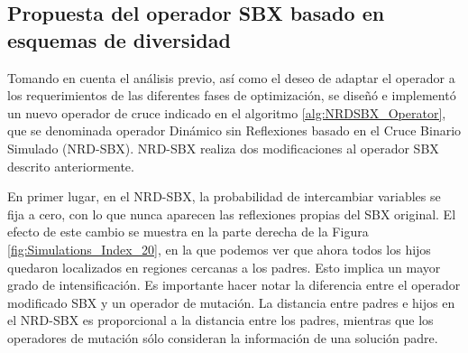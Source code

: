 \subsection{Propuesta del operador SBX basado en esquemas de diversidad}
%
Tomando en cuenta el análisis previo, así como el deseo de adaptar el operador a los requerimientos de las diferentes fases de optimización, se diseñó e implementó un nuevo operador de cruce indicado en el algoritmo \ref{alg:NRDSBX_Operator}, que se denominada operador Dinámico sin Reflexiones basado en el Cruce Binario Simulado (NRD-SBX).
%
NRD-SBX realiza dos modificaciones al operador SBX descrito anteriormente.

%
En primer lugar, en el NRD-SBX, la probabilidad de intercambiar variables se fija a cero, con lo que nunca aparecen las reflexiones propias del SBX original. 
%
El efecto de este cambio se muestra en la parte derecha de la Figura \ref{fig:Simulations_Index_20}, en la que podemos ver que ahora todos los hijos quedaron localizados en regiones cercanas a los padres.
%
Esto implica un mayor grado de intensificación.
%
Es importante hacer notar la diferencia entre el operador modificado SBX y un operador de mutación.
%
La distancia entre padres e hijos en el NRD-SBX es proporcional a la distancia entre los padres, mientras que los operadores de mutación sólo consideran la información de una solución padre.

